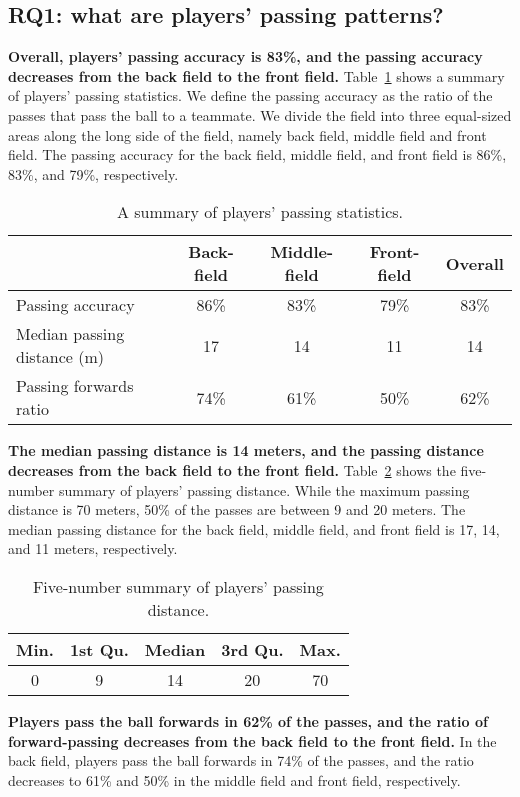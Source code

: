 \subsection{RQ1: what are players' passing patterns?}\label{RQ1-results}

\textbf{Overall, players' passing accuracy is 83\%, and the passing accuracy decreases from the back field to the front field.} 
Table~\ref{tab:pass-statistics} shows a summary of players' passing statistics. 
We define the passing accuracy as the ratio of the passes that pass the ball to a teammate.
We divide the field into three equal-sized areas along the long side of the field, namely back field, middle field and front field.
The passing accuracy for the back field, middle field, and front field is 86\%, 83\%, and 79\%, respectively.

\begin{table}[!t]
\caption{A summary of players' passing statistics.}
\centering
\begin{tabular}{lcccc}
  \hline
  & Back-field & Middle-field & Front-field & Overall \\
  \hline
  Passing accuracy & 86\% & 83\% & 79\% & 83\% \\
  Median passing distance (m) & 17 & 14 & 11 & 14 \\
  Passing forwards ratio & 74\% & 61\% & 50\% & 62\% \\
  \hline
\end{tabular}
\label{tab:pass-statistics}
\end{table}

\textbf{The median passing distance is 14 meters, and the passing distance decreases from the back field to the front field.}
Table~\ref{tab:pass-dist} shows the five-number summary of players' passing distance. While the maximum passing distance is 70 meters, 50\% of the passes are between 9 and 20 meters.
The median passing distance for the back field, middle field, and front field is 17, 14, and 11 meters, respectively.

\begin{table}[!t]
\caption{Five-number summary of players' passing distance.}
\centering
\begin{tabular}{c c c c c}
\hline
Min. & 1st Qu. & Median & 3rd Qu. & Max. \\
\hline
0 & 9 & 14 & 20 & 70 \\
\hline
\end{tabular}
\label{tab:pass-dist}
\end{table}

\textbf{Players pass the ball forwards in 62\% of the passes, and the ratio of forward-passing decreases from the back field to the front field.} In the back field, players pass the ball forwards in 74\% of the passes, and the ratio decreases to 61\% and 50\% in the middle field and front field, respectively.

